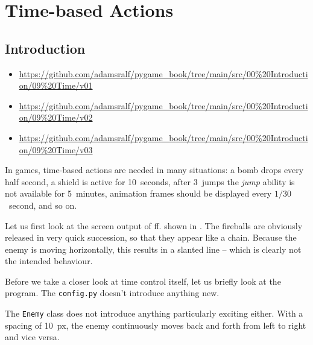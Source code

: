 \newpage
\section{Time-based Actions}\label{secZeitsteuerung}
\subsection{Introduction}
\begin{diskbox}
	\begin{itemize}
		\item \url{https://github.com/adamsralf/pygame_book/tree/main/src/00%20Introduction/09%20Time/v01}
		\item \url{https://github.com/adamsralf/pygame_book/tree/main/src/00%20Introduction/09%20Time/v02}
		\item \url{https://github.com/adamsralf/pygame_book/tree/main/src/00%20Introduction/09%20Time/v03}
	\end{itemize}
\end{diskbox}

In games, time-based actions are needed in many situations: a bomb drops every half second, a shield is active for 10~seconds, after 3~jumps the \emph{jump} ability is not available for 5~minutes, animation frames should be displayed every $1/30$~second, and so on.

Let us first look at the screen output of ff. shown in . The fireballs are obviously released in very quick succession, so that they appear like a chain. Because the enemy is moving horizontally, this results in a slanted line -- which is clearly not the intended behaviour.


Before we take a closer look at time control itself, let us briefly look at the program. The  \texttt{config.py} doesn't introduce anything new.

\newpage
{} 

The \texttt{Enemy} class does not introduce anything particularly exciting either. With a spacing of \SI{10}{px}, the enemy continuously moves back and forth from left to right and vice versa.

